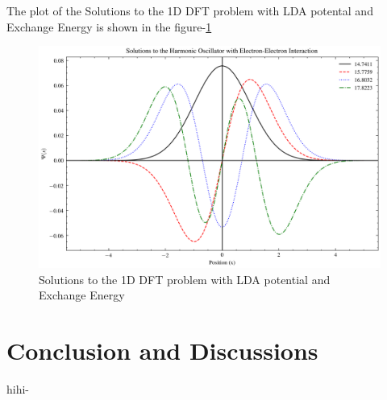 \documentclass{article}
\begin{document}
\begin{multicols}{2}
The plot of the Solutions to the 1D DFT problem with LDA potental and Exchange Energy is shown in the figure-\ref{1d_dft}

\begin{figure}[H]
    \centering
    \includegraphics[width = \columnwidth]{Images/1DDFT.png}
    \caption{Solutions to the 1D DFT problem with LDA potential and Exchange Energy}
    \label{1d_dft}
\end{figure}


\section{\label{Conclusion}Conclusion and Discussions}

hihi-\cite{ROOT}

\end{multicols}


\end{document}

